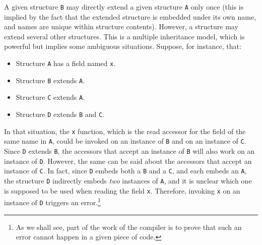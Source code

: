 A given structure \verb|B| may directly extend a given structure
\verb|A| only once (this is implied by the fact that the extended
structure is embedded under its own name, and names are unique within
structure contents). However, a structure may extend several other
structures. This is a multiple inheritance model, which is powerful but
implies some ambiguous situations. Suppose, for instance, that:
\begin{itemize}

    \item Structure \verb|A| has a field named \verb|x|.

    \item Structure \verb|B| extends \verb|A|.

    \item Structure \verb|C| extends \verb|A|.

    \item Structure \verb|D| extends \verb|B| and \verb|C|.

\end{itemize}
In that situation, the \verb|x| function, which is the read accessor for
the field of the same name in \verb|A|, could be invoked on an instance
of \verb|B| and on an instance of \verb|C|. Since \verb|D| extends
\verb|B|, the accessors that accept an instance of \verb|B| will also
work on an instance of \verb|D|. However, the same can be said about the
accessors that accept an instance of \verb|C|. In fact, since \verb|D|
embeds both a \verb|B| and a \verb|C|, and each embeds an \verb|A|, the
structure \verb|D| indirectly embeds \emph{two} instances of \verb|A|,
and it is unclear which one is supposed to be used when reading the
field \verb|x|. Therefore, invoking \verb|x| on an instance of \verb|D|
triggers an error.\footnote{As we shall see, part of the work of the
compiler is to prove that such an error cannot happen in a given piece
of code.}

